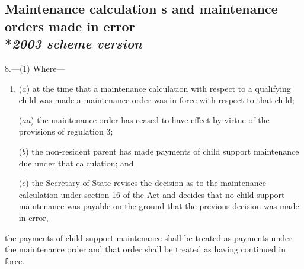 \documentclass[12pt,a4paper]{article}
\begin{document}

\subsection[8. Maintenance 
calculation%
s and maintenance orders made in error --- \emph{2003 scheme version}]{Maintenance 
calculation%
s and maintenance orders made in error\\*\emph{2003 scheme version}}

8.—(1) Where—
\begin{enumerate}\item[]
($a$) at the time that a maintenance 
calculation with respect to a qualifying child was made a maintenance order was in force with respect to that child;

($aa$) the maintenance order has ceased to have effect by virtue of the provisions of regulation 3;

($b$) the 
non-resident parent
has made payments of child support maintenance due under that 
calculation; and

($c$) 
the Secretary of State revises the decision as to the maintenance calculation under section 16 of the Act and decides that no child support maintenance was payable on the ground that the previous decision was made in error,
\end{enumerate}
the payments of child support maintenance shall be treated as payments under the maintenance order and that order shall be treated as having continued in force.
\end{document}
